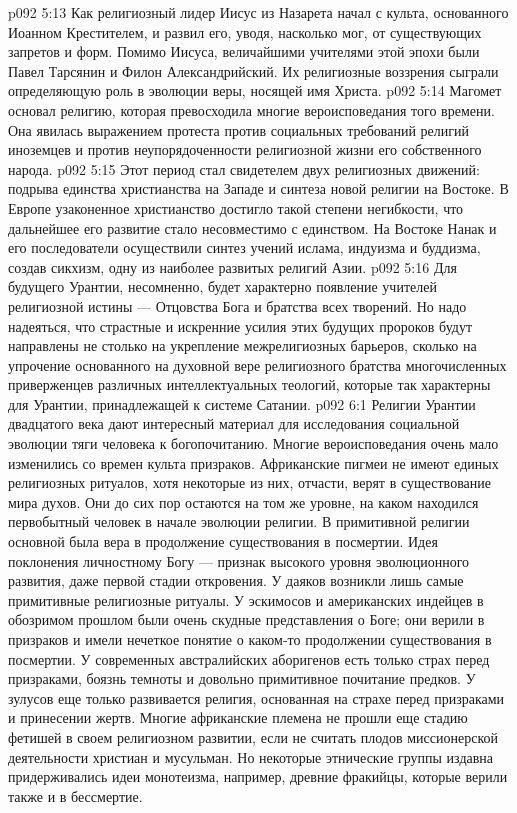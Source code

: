 \vs p092 5:13 \pc {}\bibnobreakspace {} Как религиозный лидер Иисус из Назарета начал с культа, основанного Иоанном Крестителем, и развил его, уводя, насколько мог, от существующих запретов и форм. Помимо Иисуса, величайшими учителями этой эпохи были Павел Тарсянин и Филон Александрийский. Их религиозные воззрения сыграли определяющую роль в эволюции веры, носящей имя Христа.
\vs p092 5:14 \pc {}\bibnobreakspace {} Магомет основал религию, которая превосходила многие вероисповедания того времени. Она явилась выражением протеста против социальных требований религий иноземцев и против неупорядоченности религиозной жизни его собственного народа.
\vs p092 5:15 \pc {}\bibnobreakspace {} Этот период стал свидетелем двух религиозных движений: подрыва единства христианства на Западе и синтеза новой религии на Востоке. В Европе узаконенное христианство достигло такой степени негибкости, что дальнейшее его развитие стало несовместимо с единством. На Востоке Нанак и его последователи осуществили синтез учений ислама, индуизма и буддизма, создав сикхизм, одну из наиболее развитых религий Азии.
\vs p092 5:16 \pc Для будущего Урантии, несомненно, будет характерно появление учителей религиозной истины --- Отцовства Бога и братства всех творений. Но надо надеяться, что страстные и искренние усилия этих будущих пророков будут направлены не столько на укрепление межрелигиозных барьеров, сколько на упрочение основанного на духовной вере религиозного братства многочисленных приверженцев различных интеллектуальных теологий, которые так характерны для Урантии, принадлежащей к системе Сатании.
\vs p092 6:1 Религии Урантии двадцатого века дают интересный материал для исследования социальной эволюции тяги человека к богопочитанию. Многие вероисповедания очень мало изменились со времен культа призраков. Африканские пигмеи не имеют единых религиозных ритуалов, хотя некоторые из них, отчасти, верят в существование мира духов. Они до сих пор остаются на том же уровне, на каком находился первобытный человек в начале эволюции религии. В примитивной религии основной была вера в продолжение существования в посмертии. Идея поклонения личностному Богу --- признак высокого уровня эволюционного развития, даже первой стадии откровения. У даяков возникли лишь самые примитивные религиозные ритуалы. У эскимосов и американских индейцев в обозримом прошлом были очень скудные представления о Боге; они верили в призраков и имели нечеткое понятие о каком\hyp{}то продолжении существования в посмертии. У современных австралийских аборигенов есть только страх перед призраками, боязнь темноты и довольно примитивное почитание предков. У зулусов еще только развивается религия, основанная на страхе перед призраками и принесении жертв. Многие африканские племена не прошли еще стадию фетишей в своем религиозном развитии, если не считать плодов миссионерской деятельности христиан и мусульман. Но некоторые этнические группы издавна придерживались идеи монотеизма, например, древние фракийцы, которые верили также и в бессмертие.
